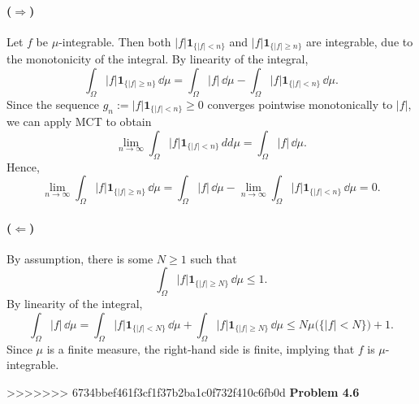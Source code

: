 \paragraph{($\Rightarrow$)} Let $f$ be $\mu$-integrable. Then both $|f|\mathbf{1}_{\{|f|<n\}}$ and $|f|\mathbf{1}_{\{|f|\ge n\}}$ are integrable, due to the monotonicity of the integral. By linearity of the integral,
\[
	\int_\Omega |f|\mathbf{1}_{\{|f|\ge n\}}\,\dd\mu = \int_\Omega |f|\,\dd\mu - \int_\Omega |f|\mathbf{1}_{\{|f|< n\}}\,\dd\mu.
\]
Since the sequence $g_n:= |f|\mathbf{1}_{\{|f|< n\}}\ge 0$ converges pointwise monotonically to $|f|$, we can apply MCT to obtain
\[
	\lim_{n\to\infty} \int_\Omega |f|\mathbf{1}_{\{|f|< n\}}\,dd\mu = \int_\Omega |f|\,\dd\mu.
\]
Hence,
\[	
	\lim_{n\to\infty}\int_\Omega |f|\mathbf{1}_{\{|f|\ge n\}}\,\dd\mu = \int_\Omega |f|\,\dd\mu - \lim_{n\to\infty}\int_\Omega |f|\mathbf{1}_{\{|f|< n\}}\,\dd\mu = 0.
\]

\paragraph{($\Leftarrow$)} By assumption, there is some $N\ge 1$ such that
\[
	\int_\Omega |f|\mathbf{1}_{\{|f|\ge N\}}\,\dd\mu \le 1.
\]
By linearity of the integral,
\[
	\int_\Omega |f|\,\dd\mu = \int_\Omega |f|\mathbf{1}_{\{|f|< N\}}\,\dd\mu +\int_\Omega |f|\mathbf{1}_{\{|f|\ge N\}}\,\dd\mu \le N \mu\bigl(\{|f|< N\}\bigr) + 1.
\]
Since $\mu$ is a finite measure, the right-hand side is finite, implying that $f$ is $\mu$-integrable.


\bigskip
>>>>>>> 6734bbef461f3cf1f37b2ba1c0f732f410c6fb0d
\textbf{Problem 4.6}

